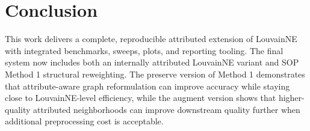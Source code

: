 \documentclass[10pt,twoside,twocolumn]{article}
\begin{document}
\section*{Conclusion}
This work delivers a complete, reproducible attributed extension of LouvainNE with integrated benchmarks, sweeps, plots, and reporting tooling. The final system now includes both an internally attributed LouvainNE variant and SOP Method 1 structural reweighting. The preserve version of Method 1 demonstrates that attribute-aware graph reformulation can improve accuracy while staying close to LouvainNE-level efficiency, while the augment version shows that higher-quality attributed neighborhoods can improve downstream quality further when additional preprocessing cost is acceptable.
\end{document}
